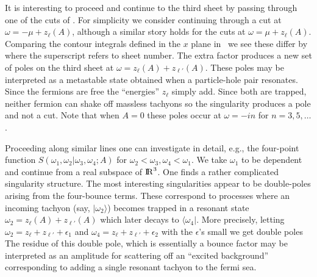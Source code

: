 It is interesting to proceed and continue to the third sheet by 
passing through one of the cuts of \cutplane. For simplicity 
we consider continuing through a cut at $\omega=-\mu+z_\ell(A)$, 
although a similar story holds for the cuts at $\omega=\mu+z_\ell(A)$.
Comparing the contour
integrals defined in the $x$ plane in 
\fig{}\ we see these differ by 
\eqn{}
where the superscript refers to sheet number. 
The extra factor produces a new set of poles on the third sheet
at $\omega=z_\ell(A)+z_{\ell'}(A)$. These poles may be interpreted as 
a metastable state obtained when a particle-hole pair 
resonates. Since the fermions are free the ``energies'' $z_\ell$ simply add. 
Since both are trapped, neither fermion can shake off massless
tachyons so the singularity produces a pole and not a cut.
Note that when $A=0$ these poles occur at $\omega=-in$ for 
$n=3,5,\dots$.
 
 
Proceeding along similar lines one can investigate in detail,
e.g., the four-point function $S(\omega_1,\omega_2|\omega_3,\omega_4;A)$
for $\omega_2<\omega_3,\omega_4<\omega_1$. We take $\omega_1$ to 
be dependent and continue from a real subspace of $\relax{\rm I\kern-.18em R}^3$.
One finds a rather complicated singularity structure. The most
interesting singularities appear to be double-poles arising from 
the four-bounce terms. These correspond to processes where an 
incoming tachyon (say, $|\omega_2\rangle$) becomes trapped in a 
resonant state $\omega_2=z_\ell(A)+z_{\ell'}(A)$ which later decays
to $\langle \omega_4|$. More precisely, letting 
$\omega_2=z_\ell + z_{\ell'}+\epsilon_1$ and $\omega_4=z_\ell + 
z_{\ell'}+\epsilon_2$
with the $\epsilon$'s small we get double poles
\eqn{} 
The residue of this double pole, which is 
essentially a bounce factor may be interpreted as an amplitude for 
scattering off an ``excited background''
corresponding to adding a single resonant tachyon to the fermi sea.
 
 
